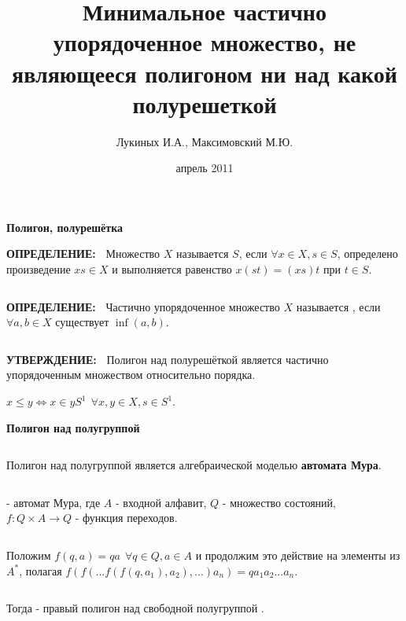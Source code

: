 \documentclass{beamer}
\title {Минимальное частично упорядоченное множество, не являющееся полигоном ни над какой полурешеткой}
\author{Лукиных И.А., Максимовский М.Ю.}
\date  {апрель 2011}
\newcommand{\green}{\color[rgb]{0,0.4,0}}
\newcommand{\blue}{\color{blue}}
\newcommand{\statement}{%
	 {\bf \green УТВЕРЖДЕНИЕ:\ }}
\newcommand{\definit}{%
     {\bf \green ОПРЕДЕЛЕНИЕ:\ }}
\newcommand{\retline}{
	
$ $

}
\begin{document}

\maketitle

\begin{frame}
{\bf {\blue} Полигон, полурешётка}

{\definit}
Множество $X$ называется \textit{\blue{полигоном над полугруппой}} $S$, если
$\forall x \in X, s \in S$, определено произведение
$xs \in X$ и выполняется равенство $x(st) = (xs)t$ при $t \in S$.
{\retline}

{\definit}
Частично упорядоченное множество $X$ называется \textit{\blue{полурешёткой}},
если $\forall a, b \in X$ существует $\inf (a, b)$. 
{\retline}

{\statement}
Полигон над полурешёткой является частично упорядоченным множеством  относительно порядка.
\begin{center}
$x \leq y \iff x \in yS^1 \ \ \forall x,y\in X, s\in S^1$.

\end{center}

\end{frame}

\begin{frame}
{\bf {\blue} Полигон над полугруппой}

{\retline}
Полигон над полугруппой является алгебраической моделью \textbf{автомата Мура}.
{\retline}

\textit{\blue{$(A, Q, f)$}} - автомат Мура, где $A$ - входной алфавит, $Q$ - множество состояний, $f: Q \times A \to Q $ - функция переходов.
{\retline}

Положим $f(q,a) = qa \ \ \forall q \in Q, a \in A$ и продолжим это действие на элементы из $A^*$, полагая $f(f(...f(f(q,a_1), a_2),...)a_n) = q a_1 a_2 ... a_n.$ 
{\retline}
Тогда \textit{\blue{$Q$}} - правый полигон над свободной полугруппой \textit{\blue{$A^*$}}.

\end{frame}
\end{document}
